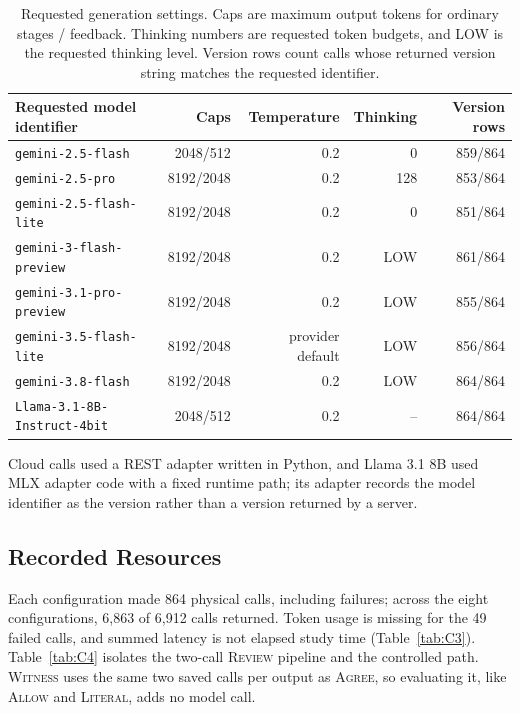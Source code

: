 \documentclass[acmsmall,review]{acmart}
\newcommand{\agree}{\textsc{Agree}}
\newcommand{\allow}{\textsc{Allow}}
\newcommand{\literal}{\textsc{Literal}}
\newcommand{\witness}{\textsc{Witness}}
\newcommand{\review}{\textsc{Review}}
\begin{document}
\begin{table}[H]
\centering
\caption{Requested generation settings. Caps are maximum output tokens for ordinary stages / feedback. Thinking numbers are requested token budgets, and LOW is the requested thinking level. Version rows count calls whose returned version string matches the requested identifier.}\label{tab:C2}
\small
\setlength{\tabcolsep}{4pt}
\begin{tabular}{@{}lrrrr@{}}
\toprule
\textbf{Requested model identifier} & \textbf{Caps} & \textbf{Temperature} & \textbf{Thinking} & \textbf{Version rows} \\
\midrule
\texttt{gemini-2.5-flash} & 2048/512 & 0.2 & 0 & 859/864 \\
\texttt{gemini-2.5-pro} & 8192/2048 & 0.2 & 128 & 853/864 \\
\texttt{gemini-2.5-flash-lite} & 8192/2048 & 0.2 & 0 & 851/864 \\
\texttt{gemini-3-flash-preview} & 8192/2048 & 0.2 & LOW & 861/864 \\
\texttt{gemini-3.1-pro-preview} & 8192/2048 & 0.2 & LOW & 855/864 \\
\texttt{gemini-3.5-flash-lite} & 8192/2048 & provider default & LOW & 856/864 \\
\texttt{gemini-3.8-flash} & 8192/2048 & 0.2 & LOW & 864/864 \\
\texttt{Llama-3.1-8B-Instruct-4bit} & 2048/512 & 0.2 & -- & 864/864 \\
\bottomrule
\end{tabular}
\end{table}

Cloud calls used a REST adapter written in Python, and Llama 3.1 8B used MLX adapter code with a fixed runtime path; its adapter records the model identifier as the version rather than a version returned by a server.

\subsection{Recorded Resources}
Each configuration made 864 physical calls, including failures; across the eight configurations, 6,863 of 6,912 calls returned. Token usage is missing for the 49 failed calls, and summed latency is not elapsed study time (Table~\ref{tab:C3}). Table~\ref{tab:C4} isolates the two-call \review{} pipeline and the controlled path. \witness{} uses the same two saved calls per output as \agree{}, so evaluating it, like \allow{} and \literal{}, adds no model call.
\end{document}
